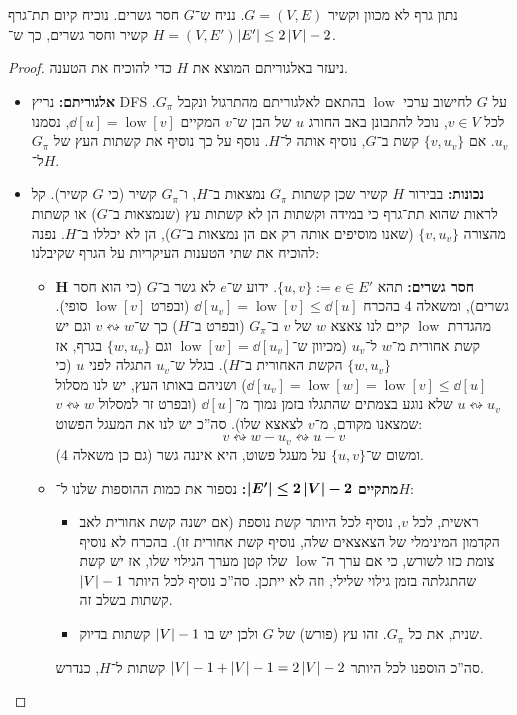 \documentclass[]{../../../../tex/classes/homework}
\newcommand\squigd{\leftrightsquigarrow}
\DeclareMathOperator{\low}{low}
\begin{document}
	\section{}
	נתון גרף לא מכוון וקשיר $G = (V, E)$. נניח ש־$G$ חסר גשרים. נוכיח קיום תת־גרף $H =(V, E')$ קשיר וחסר גשרים, כך ש־$\left \lvert E' \right \rvert \le 2\left \lvert V \right \rvert - 2$. 
	\begin{proof}
		ניעזר באלגוריתם המוצא את $H$ כדי להוכיח את הטענה. 
		\begin{itemize}
			\item \textbf{אלגוריתם: }נריץ DFS על $G$ לחישוב ערכי $\low$ בהתאם לאלגוריתם מהתרגול ונקבל $G_\pi$. לכל $v \in V$, נוכל להתבונן באב החורג $u$ של הבן ש־$v$ המקיים $\dd[u] = \low[v]$, נסמנו $u_v$. אם $\{v, u_v\}$ קשת ב־$G$, נוסיף אותה ל־$H$. נוסף על כך נוסיף את קשתות העץ של $G_\pi$ ל־$H$. 
			\item \textbf{נכונות: }בבירור $H$ קשיר שכן קשתות $G_\pi$ נמצאות ב־$H$, ו־$G_\pi$ קשיר (כי $G$ קשיר). קל לראות שהוא תת־גרף כי במידה וקשתות הן לא קשתות עץ (שנמצאות ב־$G$) או קשתות מהצורה $\{v, u_v\}$ (שאנו מוסיפים אותה רק אם הן נמצאות ב־$G$), הן לא יכללו ב־$H$. נפנה להוכיח את שתי הטענות העיקריות על הגרף שקיבלנו: 
			\begin{itemize}
				\item \textbf{$\bm{H}$ חסר גשרים: }תהא $\{u, v\} := e \in E'$. ידוע ש־$e$ לא גשר ב־$G$ (כי הוא חסר גשרים), ומשאלה 4 בהכרח $\dd[u_v] = \low[v] \le \dd[u]$ (ובפרט $\low[v]$ סופי). מהגדרת $\low$ קיים לנו צאצא $w$ של $v$ ב־$G_\pi$ (ובפרט ב־$H$) כך ש־$v \squigd w$ וגם יש קשת אחורית מ־$w$ ל־$u_v$ (מכיוון ש־$\low[w] = \dd[u_v]$ וגם $\{w, u_v\}$ בגרף, אז $\{w, u_v\}$ הקשת האחורית ב־$H$). בגלל ש־$u_v$ התגלה לפני $u$ (כי $\dd[u_v] = \low[w] = \low[v] \le \dd[u]$) ושניהם באותו העץ, יש לנו מסלול $u \squigd u_v$ שלא נוגע בצמתים שהתגלו בזמן נמוך מ־$\dd[u]$ (ובפרט זר למסלול $v \squigd w$ שמצאנו מקודם, מ־$v$ לצאצא שלו). סה''כ יש לנו את המעגל הפשוט: 
				\[ v \squigd w - u_v \squigd u - v \]
				ומשום ש־$\{u, v\}$ על מעגל פשוט, היא איננה גשר (גם כן משאלה 4). 
				\item \textbf{מתקיים $\bm{\left \lvert E' \right \rvert \le 2 \left \lvert V \right \rvert - 2}$: }נספור את כמות ההוספות שלנו ל־$H$: 
				\begin{itemize}
					\item ראשית, לכל $v$, נוסיף לכל היותר קשת נוספת (אם ישנה קשת אחורית לאב הקדמון המינימלי של הצאצאים שלה, נוסיף קשת אחורית זו). בהכרח לא נוסיף צומת כזו לשורש, כי אם ערך ה־$\low$ שלו קטן מערך הגילוי שלו, אז יש קשת שהתגלתה בזמן גילוי שלילי, וזה לא ייתכן. סה''כ נוסיף לכל היותר $\left \lvert V \right \rvert - 1$ קשתות בשלב זה. 
					\item שנית, את כל $G_\pi$. זהו עץ (פורש) של $G$ ולכן יש בו $\left \lvert V \right \rvert - 1$ קשתות בדיוק. 
				\end{itemize}
				סה''כ הוספנו לכל היותר $\left \lvert V \right \rvert - 1 + \left \lvert V \right \rvert - 1 = 2\left \lvert V \right \rvert - 2$ קשתות ל־$H$, כנדרש. 
			\end{itemize}
		\end{itemize}\envendproof
	\end{proof}
	
\end{document}
